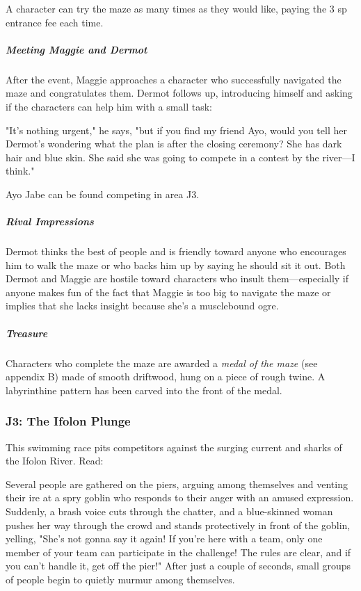\documentclass[10pt,a4paper,twoside,bg=print,twocolumn,openany,nodeprecatedcode]{dndbook}
\begin{document}
A character can try the maze as many times as they would like, paying the 3 sp entrance fee each time.

\subparagraph{Meeting Maggie and Dermot}
After the event, Maggie approaches a character who successfully navigated the maze and congratulates them. Dermot follows up, introducing himself and asking if the characters can help him with a small task:

\begin{DndReadAloud}{}
"It's nothing urgent," he says, "but if you find my friend Ayo, would you tell her Dermot's wondering what the plan is after the closing ceremony? She has dark hair and blue skin. She said she was going to compete in a contest by the river—I think."

\end{DndReadAloud}

Ayo Jabe can be found competing in area J3.

\subparagraph{Rival Impressions}
Dermot thinks the best of people and is friendly toward anyone who encourages him to walk the maze or who backs him up by saying he should sit it out. Both Dermot and Maggie are hostile toward characters who insult them—especially if anyone makes fun of the fact that Maggie is too big to navigate the maze or implies that she lacks insight because she's a musclebound ogre.

\subparagraph{Treasure}
Characters who complete the maze are awarded a \textit{medal of the maze} (see appendix B) made of smooth driftwood, hung on a piece of rough twine. A labyrinthine pattern has been carved into the front of the medal.

\subsubsection{J3: The Ifolon Plunge}
This swimming race pits competitors against the surging current and sharks of the Ifolon River. Read:

\begin{DndReadAloud}{}
Several people are gathered on the piers, arguing among themselves and venting their ire at a spry goblin who responds to their anger with an amused expression. Suddenly, a brash voice cuts through the chatter, and a blue-skinned woman pushes her way through the crowd and stands protectively in front of the goblin, yelling, "She's not gonna say it again! If you're here with a team, only one member of your team can participate in the challenge! The rules are clear, and if you can't handle it, get off the pier!" After just a couple of seconds, small groups of people begin to quietly murmur among themselves.

\end{DndReadAloud}
\end{document}
